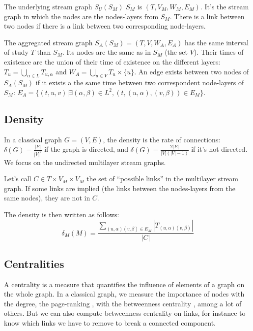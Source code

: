\documentclass{svproc}
\begin{document}
\begin{definition}
	The underlying stream graph $S_U(S_M)$ $S_M$ is  $(T,V_M,W_M,E_M)$. It's the stream graph in which the nodes are the nodes-layers from $S_M$. There is a link between two nodes if there is a link between two corresponding node-layers.
\end{definition}

	\begin{definition}

		The aggregated stream graph $S_A(S_M)=(T,V,W_A,E_A)$ has the same interval of study $T$ than $S_M$. Its nodes are the same as in $S_M$ (the set $V$). Their times of existence are the union of their time of existence on the different layers: $T_u = \bigcup_{\alpha \in L} T_{u,\alpha}$ and $W_A=\bigcup_{u\in V} T_u\times\{u\}$. An edge exists between two nodes of $S_A(S_M)$ if it exists a the same time between two correspondent node-layers of $S_M$:  $E_A = \{(t,u,v)| \exists (\alpha,\beta) \in L^2, (t,(u,\alpha),(v,\beta)) \in E_M \}$.
	\end{definition}

\subsection{Density}
%
In a classical graph $G=(V,E)$, the density is the rate of connections: $\delta(G)= \frac{|E|}{|V|^2}$ if the graph is directed, and  $\delta(G)= \frac{2|E|}{|V|(|V|-1)}$ if it's not directed. We focus on the undirected multilayer stream graphs.

\begin{definition}	Let's call $C \in T \times V_M\times V_M$ the set of ``possible links'' in the multilayer stream graph. If some links are implied (the links between the nodes-layers from the same nodes), they are not in $C$.

	The density is then written as follows:
	\[
		\delta_M (M)
		= \frac{\sum_{(u,\alpha)(v,\beta) \in E_M}|T_{(u,\alpha)(v,\beta)}|}{|C|}
	\]
\end{definition}



\subsection{Centralities}
%
A centrality is a measure that quantifies the influence of elements of a graph on the whole graph. In a classical graph, we measure the importance of nodes with the degree, the page-ranking \cite{pr}, with the betweenness centrality \cite{btw}, among a lot of others. But we can also compute betweenness centrality on links, for instance to know which links we have to remove to break a connected component.
\end{document}
